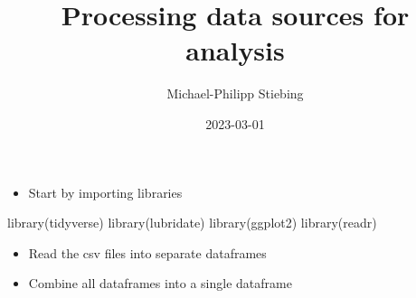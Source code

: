 \documentclass[
]{article}
\title{Processing data sources for analysis}
\author{Michael-Philipp Stiebing}
\date{2023-03-01}
\newenvironment{Shaded}{\begin{snugshade}}{\end{snugshade}}
\newcommand{\FunctionTok}[1]{\textcolor[rgb]{0.00,0.00,0.00}{#1}}
\newcommand{\NormalTok}[1]{#1}
\providecommand{\tightlist}{%
  \setlength{\itemsep}{0pt}\setlength{\parskip}{0pt}}
\begin{document}
\maketitle

\fontsize{10}{12}
\selectfont

\begin{itemize}
\tightlist
\item
  Start by importing libraries
\end{itemize}

\fontsize{9}{11}
\selectfont

\begin{Shaded}
\begin{Highlighting}[]
\FunctionTok{library}\NormalTok{(tidyverse)}
\FunctionTok{library}\NormalTok{(lubridate)}
\FunctionTok{library}\NormalTok{(ggplot2)}
\FunctionTok{library}\NormalTok{(readr)}
\end{Highlighting}
\end{Shaded}

\fontsize{10}{12}
\selectfont

\begin{itemize}
\tightlist
\item
  Read the csv files into separate dataframes
\item
  Combine all dataframes into a single dataframe
\end{itemize}

\fontsize{9}{11}
\selectfont
\end{document}
